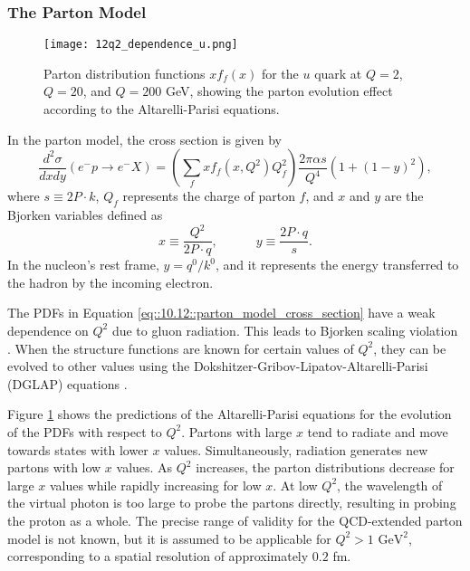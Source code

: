 \subsubsection{The Parton Model}
\label{10.12::parton_model}
    \begin{figure}[t!]
        \texttt{[image: 12q2\_dependence\_u.png]}
        \caption[$Q^2$ dependence of $x$ Particle Distribution Function for the $u$ quark]
        {Parton distribution functions $xf_f(x)$ for the $u$ quark at $Q = 2$, $Q = 20$, and $Q = 200$ GeV, showing the parton evolution effect according to the Altarelli-Parisi equations.}
        \label{fig::10.12::q2_dependence}
    \end{figure}

    In the parton model, the cross section is given by
    \begin{equation}
        \frac{d^2\sigma}{dxdy} \left( e^-p \rightarrow e^-X \right) =
            \left( \sum_f xf_f \left( x, Q^2 \right) Q_f^2 \right)
            \frac{2\pi\alpha s}{Q^4} \left( 1 + \left( 1 - y \right)^2 \right),
        \label{eq::10.12::parton_model_cross_section}
    \end{equation}
    where $s \equiv 2P\cdot k$, $Q_f$ represents the charge of parton $f$, and $x$ and $y$ are the Bjorken variables defined as
    \begin{equation*}
        x \equiv \frac{Q^2}{2P\cdot q}, \hspace{36pt} y \equiv \frac{2 P\cdot q}{s}.
    \end{equation*}
    In the nucleon's rest frame, $y = q^0/k^0$, and it represents the energy transferred to the hadron by the incoming electron.

    The PDFs in Equation \eqref{eq::10.12::parton_model_cross_section} have a weak dependence on $Q^2$ due to gluon radiation.
    This leads to Bjorken scaling violation \cite{halzen1991}.
    When the structure functions are known for certain values of $Q^2$, they can be evolved to other values using the Dokshitzer-Gribov-Lipatov-Altarelli-Parisi (DGLAP) equations \cite{dokshitzer1991}.

    Figure \ref{fig::10.12::q2_dependence} shows the predictions of the Altarelli-Parisi equations for the evolution of the PDFs with respect to $Q^2$.
    Partons with large $x$ tend to radiate and move towards states with lower $x$ values.
    Simultaneously, radiation generates new partons with low $x$ values.
    As $Q^2$ increases, the parton distributions decrease for large $x$ values while rapidly increasing for low $x$.
    At low $Q^2$, the wavelength of the virtual photon is too large to probe the partons directly, resulting in probing the proton as a whole.
    The precise range of validity for the QCD-extended parton model is not known, but it is assumed to be applicable for $Q^2 > 1 \text{ GeV}^2$, corresponding to a spatial resolution of approximately $0.2$ fm.
